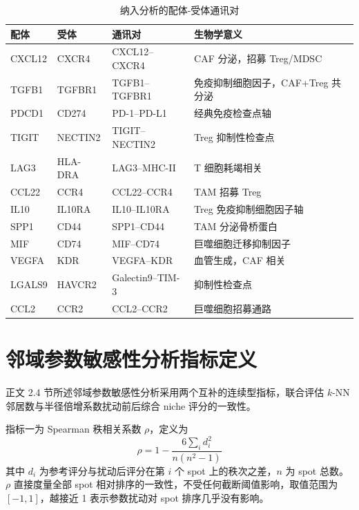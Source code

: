 \documentclass[12pt, a4paper]{ctexart}
\begin{document}
\begin{table}[H]
\centering
\caption{纳入分析的配体-受体通讯对}
\label{tab:lr_pairs}
\begin{tabularx}{\textwidth}{lllX}
\toprule
\textbf{配体} & \textbf{受体} & \textbf{通讯对} & \textbf{生物学意义} \\
\midrule
CXCL12 & CXCR4   & CXCL12--CXCR4  & CAF 分泌，招募 Treg/MDSC~\citep{domanska2013targeting} \\
TGFB1  & TGFBR1  & TGFB1--TGFBR1  & 免疫抑制细胞因子，CAF+Treg 共分泌~\citep{mariathasan2018tgfb} \\
PDCD1  & CD274   & PD-1--PD-L1    & 经典免疫检查点轴~\citep{sharma2023immunosuppressive} \\
TIGIT  & NECTIN2 & TIGIT--NECTIN2 & Treg 抑制性检查点~\citep{sakaguchi2020regulatory} \\
LAG3   & HLA-DRA & LAG3--MHC-II   & T 细胞耗竭相关~\citep{sharma2023immunosuppressive} \\
CCL22  & CCR4    & CCL22--CCR4    & TAM 招募 Treg~\citep{curiel2004specific} \\
IL10   & IL10RA  & IL10--IL10RA   & Treg 免疫抑制细胞因子轴~\citep{noy2014tumor} \\
SPP1   & CD44    & SPP1--CD44     & TAM 分泌骨桥蛋白~\citep{biswas2012macrophage} \\
MIF    & CD74    & MIF--CD74      & 巨噬细胞迁移抑制因子~\citep{noy2014tumor} \\
VEGFA  & KDR     & VEGFA--KDR     & 血管生成，CAF 相关~\citep{kalluri2016biology} \\
LGALS9 & HAVCR2  & Galectin9--TIM-3 & 抑制性检查点~\citep{sharma2023immunosuppressive} \\
CCL2   & CCR2    & CCL2--CCR2     & 巨噬细胞招募通路~\citep{biswas2012macrophage} \\
\bottomrule
\end{tabularx}
\end{table}

\section{邻域参数敏感性分析指标定义}
\label{app:sensitivity}

正文 2.4 节所述邻域参数敏感性分析采用两个互补的连续型指标，联合评估 $k$-NN 邻居数与半径倍增系数扰动前后综合 niche 评分的一致性。

指标一为 Spearman 秩相关系数 $\rho$，定义为
\begin{equation}
\rho = 1 - \frac{6 \sum_i d_i^2}{n(n^2-1)}
\label{eq:spearman}
\end{equation}
其中 $d_i$ 为参考评分与扰动后评分在第 $i$ 个 spot 上的秩次之差，$n$ 为 spot 总数。$\rho$ 直接度量全部 spot 相对排序的一致性，不受任何截断阈值影响，取值范围为 $[-1, 1]$，越接近 1 表示参数扰动对 spot 排序几乎没有影响。
\end{document}
